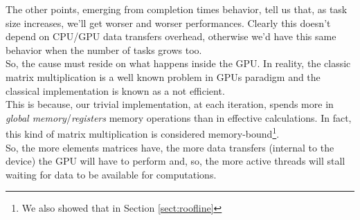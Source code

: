 The other points, emerging from completion times behavior, tell us that, as task size increases, we'll get worser and worser performances. Clearly this doesn't depend on CPU/GPU data transfers overhead, otherwise we'd have this same behavior when the number of tasks grows too.\\
So, the cause must reside on what happens inside the GPU. In reality, the classic matrix multiplication is a well known problem in GPUs paradigm and the classical implementation is known as a not efficient\cite{cudaguide}. \\
This is because, our trivial implementation, at each iteration, spends more in \textit{global memory}/\textit{registers} memory operations than in effective calculations. In fact, this kind of matrix multiplication is considered memory-bound\footnote{We also showed that in Section \ref{sect:roofline}}.\\
So, the more elements matrices have, the more data transfers (internal to the device) the GPU will have to perform and, so, the more active threads will stall waiting for data to be available for computations.\\

